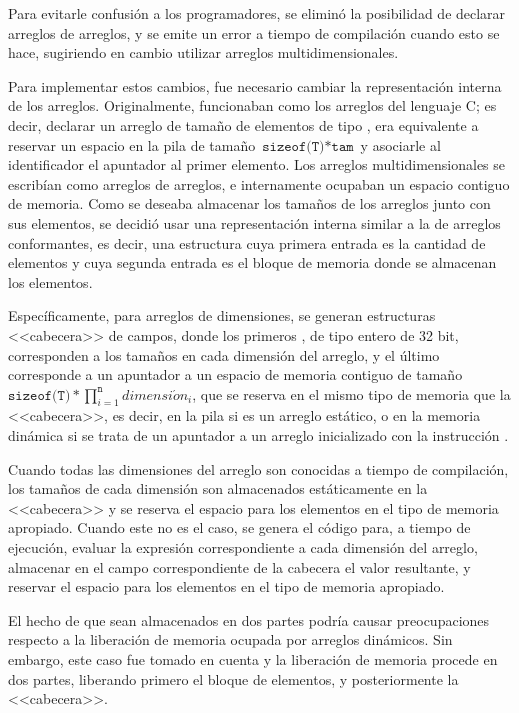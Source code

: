 Para evitarle confusión a los programadores, se eliminó la posibilidad de
declarar arreglos de arreglos, y se emite un error a tiempo de compilación
cuando esto se hace, sugiriendo en cambio utilizar arreglos multidimensionales.

Para implementar estos cambios, fue necesario cambiar la representación interna
de los arreglos. Originalmente, funcionaban como los arreglos del lenguaje C; es
decir, declarar un arreglo  de tamaño  de elementos de
tipo , era equivalente a reservar un espacio en la pila de tamaño
$\texttt{sizeof(T)} * \texttt{tam}$ y asociarle al identificador  el
apuntador al primer elemento. Los arreglos multidimensionales se escribían como
arreglos de arreglos, e internamente ocupaban un espacio contiguo de memoria.
Como se deseaba almacenar los tamaños de los arreglos junto con sus elementos,
se decidió usar una representación interna similar a la de arreglos
conformantes, es decir, una estructura cuya primera entrada es la cantidad de
elementos y cuya segunda entrada es el bloque de memoria donde se almacenan los
elementos.

Específicamente, para arreglos de  dimensiones, se generan estructuras
<<cabecera>> de  campos, donde los primeros , de tipo entero
de 32 bit, corresponden a los tamaños en cada dimensión del arreglo, y el último
corresponde a un apuntador a un espacio de memoria contiguo de tamaño
$\texttt{sizeof(T)} * \prod\limits_{i=1}^\texttt{n} dimensi\acute{o}n_i$, que se
reserva en el mismo tipo de memoria que la <<cabecera>>, es decir, en la pila si
es un arreglo estático, o en la memoria dinámica si se trata de un apuntador a
un arreglo inicializado con la instrucción .

Cuando todas las dimensiones del arreglo son conocidas a tiempo de compilación,
los tamaños de cada dimensión son almacenados estáticamente en la <<cabecera>> y
se reserva el espacio para los elementos en el tipo de memoria apropiado. Cuando
este no es el caso, se genera el código para, a tiempo de ejecución, evaluar la
expresión correspondiente a cada dimensión del arreglo, almacenar en el campo
correspondiente de la cabecera el valor resultante, y reservar el espacio para
los elementos en el tipo de memoria apropiado.

El hecho de que sean almacenados en dos partes podría causar preocupaciones
respecto a la liberación de memoria ocupada por arreglos dinámicos. Sin embargo,
este caso fue tomado en cuenta y la liberación de memoria procede en dos partes,
liberando primero el bloque de elementos, y posteriormente la <<cabecera>>.

